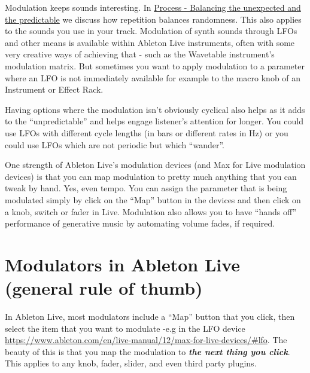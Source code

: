 \documentclass[
  12pt,
  letterpaper,
  oneside,
  open=any]{scrbook}
\begin{document}
\begin{tcolorbox}[enhanced jigsaw, opacitybacktitle=0.6, rightrule=.15mm, leftrule=.75mm, opacityback=0, toptitle=1mm, toprule=.15mm, breakable, titlerule=0mm, colback=white, bottomtitle=1mm, title=\textcolor{quarto-callout-tip-color}{\faLightbulb}\hspace{0.5em}{Key idea}, coltitle=black, left=2mm, colframe=quarto-callout-tip-color-frame, bottomrule=.15mm, colbacktitle=quarto-callout-tip-color!10!white, arc=.35mm]

Modulation keeps sounds interesting. In
\hyperref[Chapter-009-Process-Balance_unexpected_and_predictable]{Process
- Balancing the unexpected and the predictable} we discuss how
repetition balances randomness. This also applies to the sounds you use
in your track. Modulation of synth sounds through LFOs and other means
is available within Ableton Live instruments, often with some very
creative ways of achieving that - such as the Wavetable instrument's
modulation matrix. But sometimes you want to apply modulation to a
parameter where an LFO is not immediately available for example to the
macro knob of an Instrument or Effect Rack.

Having options where the modulation isn't obviously cyclical also helps
as it adds to the ``unpredictable'' and helps engage listener's
attention for longer. You could use LFOs with different cycle lengths
(in bars or different rates in Hz) or you could use LFOs which are not
periodic but which ``wander''.

One strength of Ableton Live's modulation devices (and Max for Live
modulation devices) is that you can map modulation to pretty much
anything that you can tweak by hand. Yes, even tempo. You can assign the
parameter that is being modulated simply by click on the ``Map'' button
in the devices and then click on a knob, switch or fader in Live.
Modulation also allows you to have ``hands off'' performance of
generative music by automating volume fades, if required.

\end{tcolorbox}

\section{Modulators in Ableton Live (general rule of
thumb)}\label{modulators-in-ableton-live-general-rule-of-thumb}

In Ableton Live, most modulators include a ``Map'' button that you
click, then select the item that you want to modulate -e.g in the LFO
device
\url{https://www.ableton.com/en/live-manual/12/max-for-live-devices/\#lfo}.
The beauty of this is that you map the modulation to \textbf{\emph{the
next thing you click}}. This applies to any knob, fader, slider, and
even third party plugins.
\end{document}
